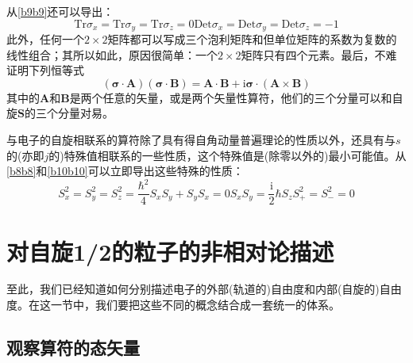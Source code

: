 \documentclass[]{article}
\begin{document}
从\eqref{b9b9}还可以导出：
\begin{subequations}
	\begin{equation}
		\mathrm{Tr}\sigma_x=\mathrm{Tr}\sigma_y=\mathrm{Tr}\sigma_z=0
	\end{equation}
	\begin{equation}
		\mathrm{Det}\sigma_x=\mathrm{Det}\sigma_y=\mathrm{Det}\sigma_z=-1
	\end{equation}
\end{subequations}
此外，任何一个$2\times2$矩阵都可以写成三个泡利矩阵和但单位矩阵的系数为复数的线性组合；其所以如此，原因很简单：一个$2\times2$矩阵只有四个元素。最后，不难证明下列恒等式
\begin{equation}
	(\boldsymbol{\sigma}\cdot\boldsymbol{A})(\boldsymbol{\sigma}\cdot\boldsymbol{B})=\boldsymbol{A}\cdot\boldsymbol{B}+\mathrm{i}\boldsymbol{\sigma}\cdot(\boldsymbol{A}\times\boldsymbol{B})
\end{equation}
其中的$\boldsymbol{A}$和$\boldsymbol{B}$是两个任意的矢量，或是两个矢量性算符，他们的三个分量可以和自旋$\boldsymbol{S}$的三个分量对易。\par 
与电子的自旋相联系的算符除了具有得自角动量普遍理论的性质以外，还具有与$s$的(亦即$j$的)特殊值相联系的一些性质，这个特殊值是(除零以外的)最小可能值。从\eqref{b8b8}和\eqref{b10b10}可以立即导出这些特殊的性质：
\begin{subequations}
	\begin{equation}
		S_x^2=S_y^2=S_z^2=\dfrac{\hbar^2}{4}
	\end{equation}
	\begin{equation}
		S_xS_y+S_yS_x=0
	\end{equation}
	\begin{equation}
		S_xS_y=\dfrac{\mathrm{i}}{2}\hbar S_z
	\end{equation}
	\begin{equation}
		S_+^2=S_-^2=0
	\end{equation}
\end{subequations}
\section{对自旋1/2的粒子的非相对论描述}
至此，我们已经知道如何分别描述电子的外部(轨道的)自由度和内部(自旋的)自由度。在这一节中，我们要把这些不同的概念结合成一套统一的体系。
\subsection{观察算符的态矢量}
\end{document}
